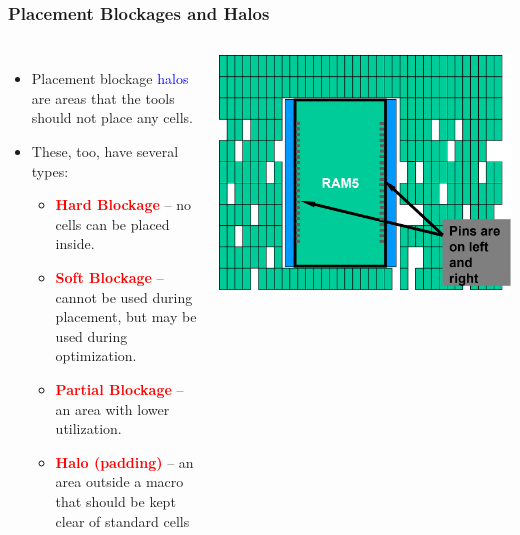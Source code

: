 \documentclass[compress]{beamer}
\begin{document}
\begin{frame}
	\frametitle{Placement Blockages and Halos}
			\begin{columns}	
		\begin{itemize}
			\item Placement blockage \textcolor{blue}{halos} are areas that the tools should not place any cells.
			\item  These, too, have several types:
				\begin{itemize}
					\item \textcolor{red}{\textbf{Hard Blockage}} – no cells can be placed
					inside.
					\item \textcolor{red}{\textbf{Soft Blockage}} – cannot be used during
					placement, but may be used during
					optimization.
					\item \textcolor{red}{\textbf{Partial Blockage}} – an area with lower
					utilization.
					\item \textcolor{red}{\textbf{Halo (padding)}} – an area outside a
					macro that should be kept clear of
					standard cells
				\end{itemize}
		\end{itemize}
		\begin{center}
			\includegraphics[width= \textwidth]{Padding}
		\end{center}
	\end{columns}
\end{frame}
\end{document}
